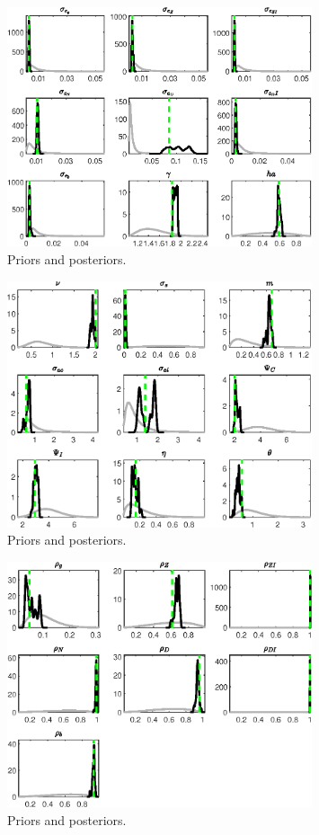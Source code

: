  
\begin{figure}[H]
\centering
\includegraphics[width=0.80\textwidth]{BRS_gen/Output/BRS_gen_PriorsAndPosteriors1}
\caption{Priors and posteriors.}\label{Fig:PriorsAndPosteriors:1}
\end{figure}
 
\begin{figure}[H]
\centering
\includegraphics[width=0.80\textwidth]{BRS_gen/Output/BRS_gen_PriorsAndPosteriors2}
\caption{Priors and posteriors.}\label{Fig:PriorsAndPosteriors:2}
\end{figure}
 
\begin{figure}[H]
\centering
\includegraphics[width=0.80\textwidth]{BRS_gen/Output/BRS_gen_PriorsAndPosteriors3}
\caption{Priors and posteriors.}\label{Fig:PriorsAndPosteriors:3}
\end{figure}
 
